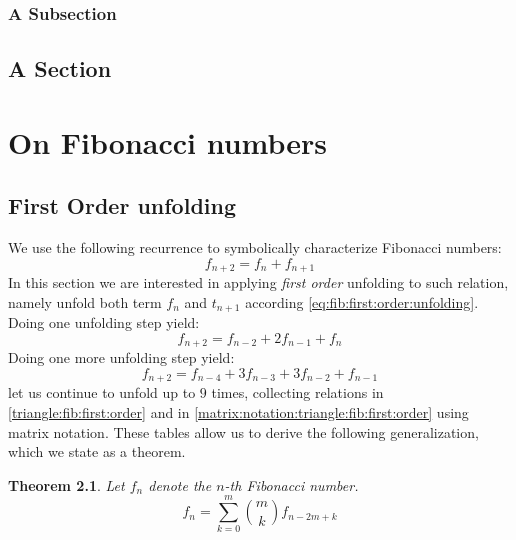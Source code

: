 \documentclass[a4paper,dottedtoc,headinclude,footinclude]{report} %
\theoremstyle{plain}
\newtheorem{thm}{Theorem}[section]
\begin{document}
    \subsection{A Subsection}
    \lipsum[1]

    \section{A Section}
    \lipsum[1]
    
    \chapter{On Fibonacci numbers}
    
    \section{First Order unfolding}
    
    We use the following recurrence to symbolically characterize Fibonacci numbers: 
    \begin{equation}
        \label{eq:fib:first:order:unfolding}
        f_{n + 2} = f_{n} + f_{n + 1}
    \end{equation}
    In this section we are interested in applying \emph{first order} unfolding
    to such relation, namely unfold both term $f_{n}$ and $t_{n+1}$ according
    \autoref{eq:fib:first:order:unfolding}. Doing one unfolding step yield:
    \begin{displaymath} 
        f_{n + 2} = f_{n - 2} + 2 f_{n - 1} + f_{n}
    \end{displaymath}
    Doing one more unfolding step yield:
    \begin{displaymath} 
        f_{n + 2} = f_{n - 4} + 3 f_{n - 3} + 3 f_{n - 2} + f_{n - 1}
    \end{displaymath}
    let us continue to unfold up to $9$ times, collecting relations in 
    \autoref{triangle:fib:first:order} and in \autoref{matrix:notation:triangle:fib:first:order}
    using matrix notation. These tables allow us to derive the 
    following generalization, which we state as a theorem.

    \begin{thm} Let $f_{n}$ denote the $n$-th Fibonacci number.
        \begin{displaymath} 
            f_{n} = \sum_{k=0}^{m} {{{m}\choose{k}} f_{n - 2 m + k}}
        \end{displaymath} 
    \end{thm}
\end{document}

